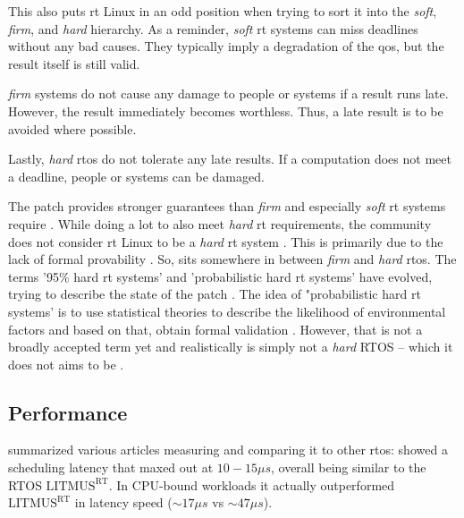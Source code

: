 \documentclass[10pt,twocolumn,a4paper]{article}
\begin{document}
This also puts \acrshort{rt} Linux in an odd position when trying to sort it into the \emph{soft}, \emph{firm}, and \emph{hard} hierarchy.
As a reminder, \emph{soft} \acrshort{rt} systems can miss deadlines without any bad causes.
They typically imply a degradation of the \acrshort{qos}, but the result itself is still valid.

\emph{firm} systems do not cause any damage to people or systems if a result runs late.
However, the result immediately becomes worthless.
Thus, a late result is to be avoided where possible.

Lastly, \emph{hard} \acrshort{rtos} do not tolerate any late results.
If a computation does not meet a deadline, people or systems can be damaged.

The  patch provides stronger guarantees than \emph{firm} and especially \emph{soft} \acrshort{rt} systems require \cite{reghenzani_realtime_2019}.
While doing a lot to also meet \emph{hard} \acrshort{rt} requirements, the community does not consider \acrshort{rt} Linux to be a \emph{hard} \acrshort{rt} system \cite{reghenzani_realtime_2019}.
This is primarily due to the lack of formal provability \cite{reghenzani_realtime_2019}.
So,  sits somewhere in between \emph{firm} and \emph{hard} \acrshort{rtos}.
The terms '95\% hard \acrshort{rt} systems' and 'probabilistic hard \acrshort{rt} systems' have evolved, trying to describe the state of the patch \cite{reghenzani_realtime_2019}.
The idea of "probabilistic hard \acrshort{rt} systems' is to use statistical theories to describe the likelihood of environmental factors and based on that, obtain formal validation \cite{reghenzani_realtime_2019}.
However, that is not a broadly accepted term yet and realistically  is simply not a \emph{hard} RTOS \cite{reghenzani_realtime_2019} -- which it does not aims to be \cite{jason_perlow_trenches_2021}.

\subsection{Performance}
\cite{reghenzani_realtime_2019} summarized various articles measuring  and comparing it to other \acrshort{rtos}:
 showed a scheduling latency that maxed out at $10 - 15\mu s$, overall being similar to the RTOS $\text{LITMUS}^{\text{RT}}$.
In CPU-bound workloads it actually outperformed $\text{LITMUS}^{\text{RT}}$ in latency speed ($\sim 17\mu s$ vs $\sim 47\mu s$).
\end{document}
